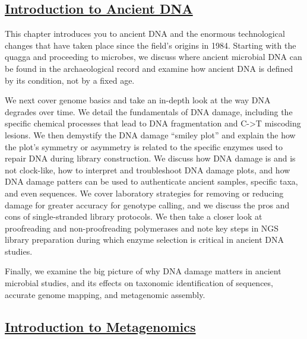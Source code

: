 \documentclass[
  letterpaper,
]{book}
\begin{document}
\hypertarget{introduction-to-ancient-dna}{%
\subsection*{\texorpdfstring{\protect\hyperlink{introduction-to-ancient-dna-1}{Introduction
to Ancient
DNA}}{Introduction to Ancient DNA}}\label{introduction-to-ancient-dna}}

This chapter introduces you to ancient DNA and the enormous
technological changes that have taken place since the field's origins in
1984. Starting with the quagga and proceeding to microbes, we discuss
where ancient microbial DNA can be found in the archaeological record
and examine how ancient DNA is defined by its condition, not by a fixed
age.

We next cover genome basics and take an in-depth look at the way DNA
degrades over time. We detail the fundamentals of DNA damage, including
the specific chemical processes that lead to DNA fragmentation and
C-\textgreater T miscoding lesions. We then demystify the DNA damage
``smiley plot'' and explain the how the plot's symmetry or asymmetry is
related to the specific enzymes used to repair DNA during library
construction. We discuss how DNA damage is and is not clock-like, how to
interpret and troubleshoot DNA damage plots, and how DNA damage patters
can be used to authenticate ancient samples, specific taxa, and even
sequences. We cover laboratory strategies for removing or reducing
damage for greater accuracy for genotype calling, and we discuss the
pros and cons of single-stranded library protocols. We then take a
closer look at proofreading and non-proofreading polymerases and note
key steps in NGS library preparation during which enzyme selection is
critical in ancient DNA studies.

Finally, we examine the big picture of why DNA damage matters in ancient
microbial studies, and its effects on taxonomic identification of
sequences, accurate genome mapping, and metagenomic assembly.

\hypertarget{introduction-to-metagenomics}{%
\subsection*{\texorpdfstring{\protect\hyperlink{introduction-to-metagenomics-1}{Introduction
to
Metagenomics}}{Introduction to Metagenomics}}\label{introduction-to-metagenomics}}
\end{document}
